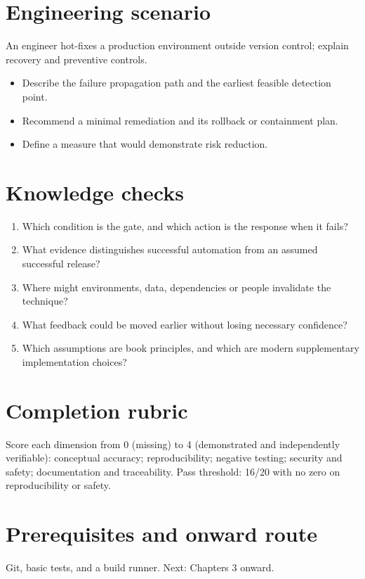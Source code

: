 \documentclass[10pt,letterpaper]{article}
\begin{document}
\section{Engineering scenario}
An engineer hot-fixes a production environment outside version control; explain recovery and preventive controls.

\begin{itemize}
\item Describe the failure propagation path and the earliest feasible detection point.
\item Recommend a minimal remediation and its rollback or containment plan.
\item Define a measure that would demonstrate risk reduction.
\end{itemize}

\section{Knowledge checks}
\begin{enumerate}
\item Which condition is the gate, and which action is the response when it fails?
\item What evidence distinguishes successful automation from an assumed successful release?
\item Where might environments, data, dependencies or people invalidate the technique?
\item What feedback could be moved earlier without losing necessary confidence?
\item Which assumptions are book principles, and which are modern supplementary implementation choices?
\end{enumerate}

\section{Completion rubric}
Score each dimension from 0 (missing) to 4 (demonstrated and independently verifiable): conceptual accuracy; reproducibility; negative testing; security and safety; documentation and traceability. Pass threshold: 16/20 with no zero on reproducibility or safety.


\section{Prerequisites and onward route}
Git, basic tests, and a build runner. Next: Chapters 3 onward.
\end{document}
